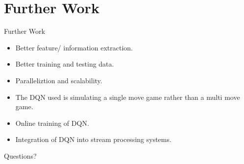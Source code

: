 \section{Further Work}
\frame{\sectionpage}

\begin{frame}{Further Work}
    \begin{itemize}
        \item Better feature/ information extraction.
        \item Better training and testing data.
        \item Paralleliztion and scalability.
        \item The DQN used is simulating a single move game rather than a multi move game.
        \item Online training of DQN.
        \item Integration of DQN into stream processing systems.
    \end{itemize}
\end{frame}

\begin{frame}{}
    \begin{center}
        Questions?
    \end{center}
\end{frame}
